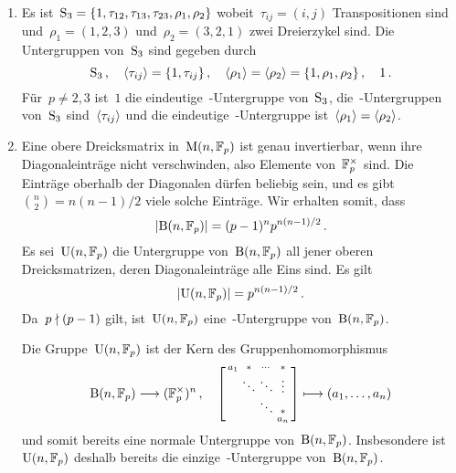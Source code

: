 \documentclass{scrartcl}
\begin{document}
\begin{solution}
  \begin{enumerate}
    \item
      Es ist~$\operatorname{S}_3 = \{ 1, \tau_{12}, \tau_{13}, \tau_{23}, \rho_1, \rho_2 \}$ wobeit~$\tau_{ij} = (i,j)$ Transpositionen sind und~$\rho_1 = (1,2,3)$ und~$\rho_2 = (3,2,1)$ zwei Dreierzykel sind.
      Die Untergruppen von~$\operatorname{S}_3$ sind gegeben durch
      \[
        \operatorname{S}_3 \,,
        \quad
        \langle \tau_{ij} \rangle = \{ 1, \tau_{ij} \} \,,
        \quad
        \langle \rho_1 \rangle = \langle \rho_2 \rangle = \{ 1, \rho_1, \rho_2 \} \,,
        \quad
        1 \,.
      \]
      Für~$p \neq 2, 3$ ist~$1$ die eindeutige~-Untergruppe von~$\operatorname{S}_3$, die~-Untergruppen von~$\operatorname{S}_3$ sind~$\langle \tau_{ij} \rangle$ und die eindeutige~-Untergruppe ist~$\langle\rho_1\rangle = \langle\rho_2\rangle$.
    \item
      Eine obere Dreicksmatrix in~$\operatorname{M}(n, \mathbb{F}_p)$ ist genau invertierbar, wenn ihre Diagonaleinträge nicht verschwinden, also Elemente von~$\mathbb{F}_p^\times$ sind.
      Die Einträge oberhalb der Diagonalen dürfen beliebig sein, und es gibt~$\binom{n}{2} = n(n-1)/2$ viele solche Einträge.
      Wir erhalten somit, dass
      \[
        \lvert \operatorname{B}(n, \mathbb{F}_p) \rvert
        =
        (p-1)^n p^{n(n-1)/2} \,.
      \]
      Es sei~$\operatorname{U}(n, \mathbb{F}_p)$ die Untergruppe von~$\operatorname{B}(n, \mathbb{F}_p)$ all jener oberen Dreicksmatrizen, deren Diagonaleinträge alle Eins sind.
      Es gilt
      \[
        \lvert \operatorname{U}(n, \mathbb{F}_p) \rvert
        =
        p^{n(n-1)/2} \,.
      \]
      Da~$p \nmid (p-1)$ gilt, ist~$\operatorname{U}(n, \mathbb{F}_p)$ eine~-Untergruppe von~$\operatorname{B}(n, \mathbb{F}_p)$.

      Die Gruppe~$\operatorname{U}(n, \mathbb{F}_p)$ ist der Kern des Gruppenhomomorphismus
      \[
        \Borel(n, \Finite_p)
        \to
        ( \Finite_p^\times )^n \,,
        \quad
        \begin{bsmallmatrix}
          a_1 & *       & \cdots  & *       \\
              & \ddots  & \ddots  & \vdots  \\
              &         & \ddots  & *       \\
              &         &         & a_n
        \end{bsmallmatrix}
        \mapsto
        (a_1, \dotsc, a_n)
      \]
      und somit bereits eine normale Untergruppe von~$\operatorname{B}(n, \mathbb{F}_p)$.
      Insbesondere ist~$\operatorname{U}(n, \mathbb{F}_p)$ deshalb bereits die einzige~-Untergruppe von~$\operatorname{B}(n, \mathbb{F}_p)$.
  \end{enumerate}
\end{solution}
\end{document}
